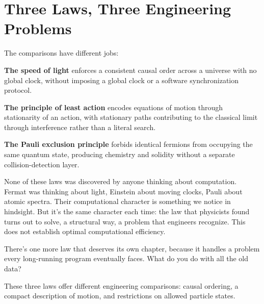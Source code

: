 \section{Three Laws, Three Engineering Problems}

The comparisons have different jobs:

\begin{compactchecklist}
\item \textbf{The speed of light} enforces a consistent causal order across a universe with no global clock, without imposing a global clock or a software synchronization protocol.
\item \textbf{The principle of least action} encodes equations of motion through stationarity of an action, with stationary paths contributing to the classical limit through interference rather than a literal search.
\item \textbf{The Pauli exclusion principle} forbids identical fermions from occupying the same quantum state, producing chemistry and solidity without a separate collision-detection layer.
\end{compactchecklist}

None of these laws was discovered by anyone thinking about computation. Fermat was thinking about light, Einstein about moving clocks, Pauli about atomic spectra. Their computational character is something we notice in hindsight. But it's the same character each time: the law that physicists found turns out to solve, a structural way, a problem that engineers recognize. This does not establish optimal computational efficiency.

There's one more law that deserves its own chapter, because it handles a problem every long-running program eventually faces. What do you do with all the old data?

\begin{keytakeawaybox}
These three laws offer different engineering comparisons: causal ordering, a compact description of motion, and restrictions on allowed particle states.
\end{keytakeawaybox}

